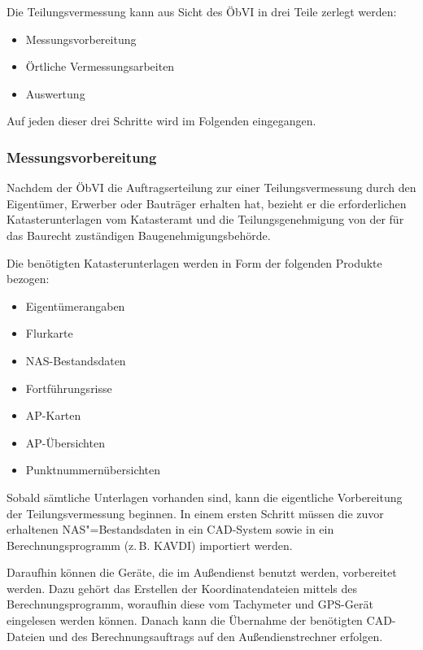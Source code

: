 Die Teilungsvermessung kann aus Sicht des \ac{ÖbVI} in drei Teile zerlegt werden:
\begin{itemize}
	\item Messungsvorbereitung
	\item Örtliche Vermessungsarbeiten
	\item Auswertung
\end{itemize}

Auf jeden dieser drei Schritte wird im Folgenden eingegangen.

\subsubsection{Messungsvorbereitung}

Nachdem der \ac{ÖbVI} die Auftragserteilung zur einer Teilungsvermessung durch den Eigentümer, Erwerber oder Bauträger erhalten hat, bezieht er die erforderlichen Katasterunterlagen vom Katasteramt und die Teilungsgenehmigung von der für das Baurecht zuständigen Baugenehmigungsbehörde.

Die benötigten Katasterunterlagen werden in Form der folgenden Produkte bezogen:
\begin{itemize}
	\item Eigentümerangaben
	\item Flurkarte
	\item NAS-Bestandsdaten
	\item Fortführungsrisse
	\item AP-Karten
	\item AP-Übersichten
	\item Punktnummernübersichten
\end{itemize}
Sobald sämtliche Unterlagen vorhanden sind, kann die eigentliche Vorbereitung der Teilungsvermessung beginnen.
In einem ersten Schritt müssen die zuvor erhaltenen NAS"=Bestandsdaten in ein CAD-System sowie in ein Berechnungsprogramm (z.\,B. KAVDI) importiert werden.

Daraufhin können die Geräte, die im Außendienst benutzt werden, vorbereitet werden.
Dazu gehört das Erstellen der Koordinatendateien mittels des Berechnungsprogramm, woraufhin diese vom Tachymeter und GPS-Gerät eingelesen werden können. Danach kann die Übernahme der benötigten CAD-Dateien und des Berechnungsauftrags auf den Außendienstrechner erfolgen.

